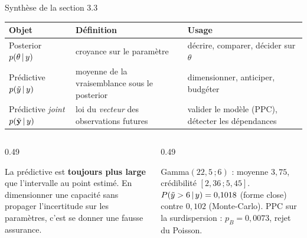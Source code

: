 \begin{frame}{Synthèse de la section 3.3}
\begin{center}
{\small
\begin{tabular}{@{}p{}p{}p{}@{}}
\toprule
\textbf{Objet} & \textbf{Définition} & \textbf{Usage} \\
\midrule
Posterior $p(\theta \,\vert\, y)$ & croyance sur le paramètre &
décrire, comparer, décider sur $\theta$ \\
\addlinespace
Prédictive $p(\tilde y \,\vert\, y)$ & moyenne de la vraisemblance sous le posterior &
dimensionner, anticiper, budgéter \\
\addlinespace
Prédictive \textit{joint} $p(\tilde{\mathbf y} \,\vert\, y)$ & loi du \emph{vecteur}
des observations futures & valider le modèle (PPC), détecter les dépendances \\
\bottomrule
\end{tabular}}
\end{center}
\vspace{1.5mm}
\begin{columns}[t]
\begin{column}{0.49\textwidth}
\begin{kbox}[À retenir]
La prédictive est \textbf{toujours plus large} que l'intervalle au point estimé.
En dimensionner une capacité sans propager l'incertitude sur les paramètres,
c'est se donner une fausse assurance.
\end{kbox}
\end{column}
\begin{column}{0.49\textwidth}
\begin{ebox}
Gamma$(22{,}5\,;6)$ : moyenne $3{,}75$, crédibilité $[2{,}36\,;5{,}45]$.
$P(\tilde y > 6 \,\vert\, y) = 0{,}1018$ (forme close) contre $0{,}102$
(Monte-Carlo). PPC sur la surdispersion : $p_B = 0{,}0073$, rejet du Poisson.
\end{ebox}
\end{column}
\end{columns}
\end{frame}
